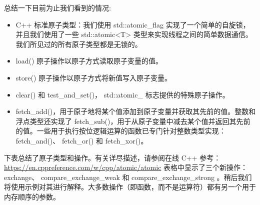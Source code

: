 总结一下目前为止我们看到的情况:

\begin{itemize}
\item
C++ 标准原子类型：我们使用 std::atomic\_flag 实现了一个简单的自旋锁，并且我们使用了一些 std::atomic<T> 类型来实现线程之间的简单数据通信。我们所见过的所有原子类型都是无锁的。

\item
load() 原子操作以原子方式读取原子变量的值。

\item
store() 原子操作以原子方式将新值写入原子变量。

\item
clear() 和 test\_and\_set()， std::atomic\_ 标志提供的特殊原子操作。

\item
fetch\_add()，用于原子地将某个值添加到原子变量并获取其先前的值。整数和浮点类型还实现了 fetch\_sub()，用于从原子变量中减去某个值并返回其先前的值。一些用于执行按位逻辑运算的函数已专门针对整数类型实现： fetch\_and()、 fetch\_or() 和 fetch\_xor()。
\end{itemize}

下表总结了原子类型和操作。有关详尽描述，请参阅在线 C++ 参考： \url{https://en.cppreference.com/w/cpp/atomic/atomic} 表格中显示了三个新操作： exchange、 compare\_exchange\_weak 和 compare\_exchange\_strong 。稍后我们将使用示例对其进行解释。大多数操作（即函数，而不是运算符）都有另一个用于内存顺序的参数。

